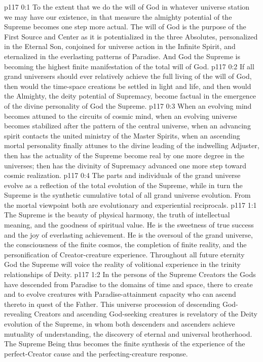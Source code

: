 \author{Mighty Messenger}
\vs p117 0:1 To the extent that we do the will of God in whatever universe station we may have our existence, in that measure the almighty potential of the Supreme becomes one step more actual. The will of God is the purpose of the First Source and Center as it is potentialized in the three Absolutes, personalized in the Eternal Son, conjoined for universe action in the Infinite Spirit, and eternalized in the everlasting patterns of Paradise. And God the Supreme is becoming the highest finite manifestation of the total will of God.
\vs p117 0:2 If all grand universers should ever relatively achieve the full living of the will of God, then would the time\hyp{}space creations be settled in light and life, and then would the Almighty, the deity potential of Supremacy, become factual in the emergence of the divine personality of God the Supreme.
\vs p117 0:3 When an evolving mind becomes attuned to the circuits of cosmic mind, when an evolving universe becomes stabilized after the pattern of the central universe, when an advancing spirit contacts the united ministry of the Master Spirits, when an ascending mortal personality finally attunes to the divine leading of the indwelling Adjuster, then has the actuality of the Supreme become real by one more degree in the universes; then has the divinity of Supremacy advanced one more step toward cosmic realization.
\vs p117 0:4 The parts and individuals of the grand universe evolve as a reflection of the total evolution of the Supreme, while in turn the Supreme is the synthetic cumulative total of all grand universe evolution. From the mortal viewpoint both are evolutionary and experiential reciprocals.
\vs p117 1:1 The Supreme is the beauty of physical harmony, the truth of intellectual meaning, and the goodness of spiritual value. He is the sweetness of true success and the joy of everlasting achievement. He is the oversoul of the grand universe, the consciousness of the finite cosmos, the completion of finite reality, and the personification of Creator\hyp{}creature experience. Throughout all future eternity God the Supreme will voice the reality of volitional experience in the trinity relationships of Deity.
\pc \vs p117 1:2 In the persons of the Supreme Creators the Gods have descended from Paradise to the domains of time and space, there to create and to evolve creatures with Paradise\hyp{}attainment capacity who can ascend thereto in quest of the Father. This universe procession of descending God\hyp{}revealing Creators and ascending God\hyp{}seeking creatures is revelatory of the Deity evolution of the Supreme, in whom both descenders and ascenders achieve mutuality of understanding, the discovery of eternal and universal brotherhood. The Supreme Being thus becomes the finite synthesis of the experience of the perfect\hyp{}Creator cause and the perfecting\hyp{}creature response.\plusone
